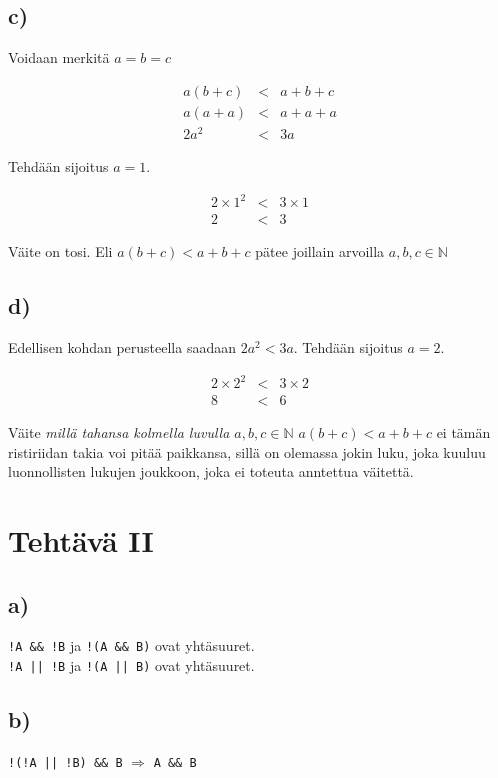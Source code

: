 \documentclass[a4paper, 12pt]{article}
\begin{document}
\subsection*{c)}
Voidaan merkitä $a=b=c$
\begin{center}
\begin{eqnarray*}
a\left(b+c\right)&<&a+b+c \\
a\left(a+a\right)&<&a+a+a \\
2a^2 &<& 3a
\end{eqnarray*}
\end{center}
Tehdään sijoitus $a=1$.

\begin{center}
\begin{eqnarray*}
2 \times 1^{2} &<&  3 \times 1 \\
2 &<& 3
\end{eqnarray*}
\end{center}
Väite on tosi. Eli $a\left(b+c\right)<a+b+c$ pätee joillain arvoilla $a,b,c \in \mathbb{N}$
\subsection*{d)}
Edellisen kohdan perusteella saadaan $2a^2<3a$. Tehdään sijoitus $a=2$.
\begin{center}
\begin{eqnarray*}
2 \times 2^2 &<& 3 \times 2 \\
8 &<& 6
\end{eqnarray*}
\end{center}
Väite \emph{millä tahansa kolmella luvulla $a,b,c \in \mathbb{N}$   $a\left(b+c\right)<a+b+c$} ei tämän ristiriidan takia voi pitää paikkansa, sillä on olemassa jokin luku, joka kuuluu luonnollisten lukujen joukkoon, joka ei toteuta anntettua väitettä.

\section*{Tehtävä II}
\subsection*{a)}
\texttt{!A \&\& !B} ja \texttt{!(A \&\& B)} ovat yhtäsuuret. \\
\texttt{!A || !B} ja \texttt{!(A || B)} ovat yhtäsuuret.
\subsection*{b)}
\texttt{!(!A || !B) \&\& B} $\Rightarrow$ \texttt{A \&\& B}
\end{document}
